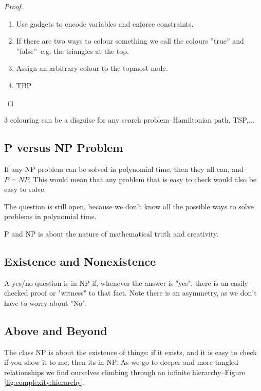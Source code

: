 \documentclass[]{article}
\begin{document}
\begin{proof}
	\begin{enumerate}
		\item Use gadgets to encode variables and enforce constraints.
		\item If there are two ways to colour something we call the colours ''true'' and ''false''--e.g. the triangles at the top.
		\item Assign an arbitrary colour to the topmost node.
		\item TBP
	\end{enumerate}
\end{proof}

3 colouring can be a disguise for any search problem--Hamiltonian path, TSP,...

\subsection{P versus NP Problem}

If any NP problem can be solved in polynomial time, then they all can, and $P=NP$. This would mean that any problem that is easy to check would also be easy to solve.

The question is still open, because we don't know all the possible ways to solve problems in polynomial time.

P and NP is about the nature of mathematical truth and creativity.

\subsection{Existence and Nonexistence }

A yes/no question is in NP if, whenever the answer is "yes", there is an easily checked proof or "witness" to that fact. Note there is an asymmetry, as we don't have to worry about "No". 

\subsection{Above and Beyond}

The class NP is about the existence of things: if it exists, and it is easy to check if you show it to me, then its in NP. As we go to deeper and more tangled relationships we find ourselves climbing through an infinite hierarchy--Figure \ref{fig:complexity:hierarchy}.
\end{document}
